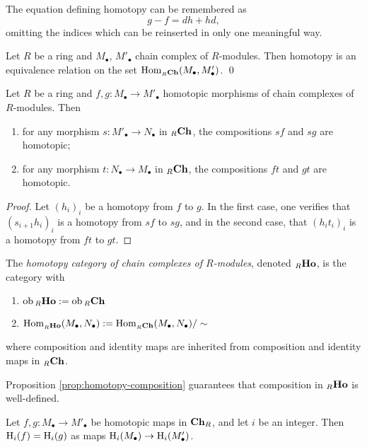The equation defining homotopy can be remembered as
\[
	g-f=dh+hd,
\]
omitting the indices which can be reinserted in only one meaningful way. 

\begin{proposition}\label{prop:homotopy-equivalence-relation}
Let $R$ be a ring and $M_\bullet$, $M'_\bullet$ chain complex of $R$-modules. Then homotopy is an equivalence relation on the set
 $\operatorname{Hom}_{{}_R\mathbf{Ch}}(M_\bullet,M'_\bullet)$. \qed
\end{proposition}



\begin{proposition}\label{prop:homotopy-composition}
Let $R$ be a ring and $f,g \colon M_\bullet \to M'_\bullet$ homotopic morphisms of chain complexes of $R$-modules. Then
\begin{enumerate}
\item for any morphism $s\colon M'_\bullet \to N_\bullet$ in ${}_R\mathbf{Ch}$, the compositions $sf$ and $sg$ are homotopic;
\item for any morphism $t\colon N_\bullet \to M_\bullet$ in ${}_R\mathbf{Ch}$, the compositions $ft$ and $gt$ are homotopic.
\end{enumerate}
\end{proposition}


\begin{proof}
Let $(h_i)_i$ be a homotopy from $f$ to $g$. In the first case, one  verifies that $(s_{i+1}h_i)_i$ is a homotopy from $sf$ to $sg$, and in the second case,  that $(h_it_i)_i$ is a homotopy from $ft$ to $gt$. 
\end{proof}

\begin{definition}
The \emph{homotopy category of chain complexes of $R$-modules}, denoted ${}_R\mathbf{Ho}$,  is the
category with
\begin{enumerate}
\item $\operatorname{ob} {}_R\mathbf{Ho} := \operatorname{ob} {}_R\mathbf{Ch}$
\item $\operatorname{Hom}_{{}_R\mathbf{Ho}}(M_\bullet,N_\bullet) := \operatorname{Hom}_{{}_R\mathbf{Ch}}(M_\bullet, N_\bullet) / \sim$
\end{enumerate}
where composition and identity maps are inherited from composition and identity maps in ${}_R\mathbf{Ch}$.
\end{definition}

Proposition  \ref{prop:homotopy-composition} guarantees that composition in ${}_R\mathbf{Ho}$ is well-defined. 

\begin{proposition}\label{prop:homotopic-maps-agree-on-homology}
Let $f,g\colon M_\bullet \to M'_\bullet$ be homotopic maps in $\mathbf{Ch}_R$, and let $i$ be an integer. Then ${\mathrm H}_i(f)={\mathrm H}_i(g)$ as maps ${\mathrm H}_i(M_\bullet) \to {\mathrm H}_i(M'_\bullet)$.
\end{proposition}

